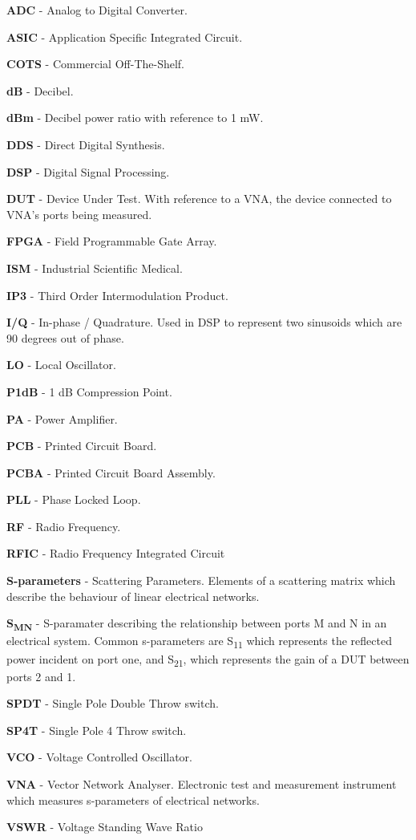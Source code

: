 \textbf{ADC} - Analog to Digital Converter.

\textbf{ASIC} - Application Specific Integrated Circuit.

\textbf{COTS} - Commercial Off-The-Shelf.

\textbf{dB} - Decibel.

\textbf{dBm} - Decibel power ratio with reference to 1 mW.

\textbf{DDS} - Direct Digital Synthesis. 

\textbf{DSP} - Digital Signal Processing.

\textbf{DUT} - Device Under Test. With reference to a VNA, the device connected to VNA's ports being measured. 

\textbf{FPGA} - Field Programmable Gate Array.

\textbf{ISM} - Industrial Scientific Medical.

\textbf{IP3} - Third Order Intermodulation Product.

\textbf{I/Q} - In-phase / Quadrature. Used in DSP to represent two sinusoids which are 90 degrees out of phase. 

\textbf{LO} - Local Oscillator. 

\textbf{P1dB} - 1 dB Compression Point. 

\textbf{PA} - Power Amplifier.

\textbf{PCB} - Printed Circuit Board. 

\textbf{PCBA} - Printed Circuit Board Assembly.

\textbf{PLL} - Phase Locked Loop.

\textbf{RF} - Radio Frequency.

\textbf{RFIC} - Radio Frequency Integrated Circuit

\textbf{S-parameters} - Scattering Parameters. Elements of a scattering matrix which describe the behaviour of linear electrical networks. 

\textbf{S\textsubscript{MN}} - S-paramater describing the relationship between ports M and N in an electrical system. Common s-parameters are S\textsubscript{11} which represents the reflected power incident on port one, and S\textsubscript{21}, which represents the gain of a DUT between ports 2 and 1. 

\textbf{SPDT} - Single Pole Double Throw switch. 

\textbf{SP4T} - Single Pole 4 Throw switch. 

\textbf{VCO} - Voltage Controlled Oscillator.

\textbf{VNA} - Vector Network Analyser. Electronic test and measurement instrument which measures s-parameters of electrical networks. 

\textbf{VSWR} - Voltage Standing Wave Ratio
